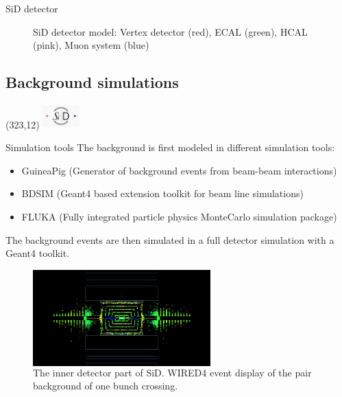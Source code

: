 \documentclass[xcolor={dvipsnames}]{beamer}
\newcommand{\sidlogo}{
  \setlength{\TPHorizModule}{1pt}
  \setlength{\TPVertModule}{1pt}
  \begin{textblock}{1}(323,12)
   \includegraphics[width=40pt,height=26pt]{figures/SiD.jpeg}
  \end{textblock}
  }
\begin{document}
\begin{frame}{SiD detector}
\begin{figure}[T]
\begin{subfigure}[b]{0.49\textwidth}
\end{subfigure}
\caption{\small SiD detector model: Vertex detector (red), ECAL (green), HCAL (pink), Muon system (blue)}
\end{figure}
\end{frame}

\subsection{Background simulations}
\sidlogo
\begin{frame}{Simulation tools}
The background is first modeled in different simulation tools:\\
\begin{itemize}
\item \alert{GuineaPig} (Generator of background events from beam-beam interactions)
\item \alert{BDSIM} (Geant4 based extension toolkit for beam line simulations)
\item \alert{FLUKA} (Fully integrated particle physics MonteCarlo simulation package)
\end{itemize}
\vspace*{0.5cm}
The background events are then simulated in a \alert{full detector simulation} with a Geant4 toolkit.\\
\vspace*{0.2cm}
\begin{figure}
	\begin{columns}
         \flushright
        \includegraphics[width=0.61\textwidth]{figures/Full_bunchcrossing_rhoz.png}
        \caption{\small The inner detector part of SiD. WIRED4 event display of the pair background of one bunch crossing.}
      \end{columns}
\end{figure}
	
\end{frame}
\end{document}
